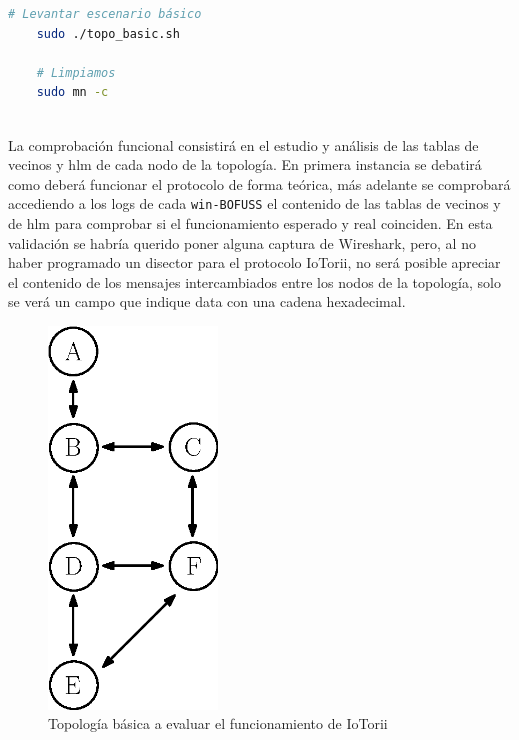 \begin{lstlisting}[language= bash, style=Consola, caption={Puesta en marcha y limpieza del escenario},label=code:eva_scenario]
    # Levantar escenario básico
    sudo ./topo_basic.sh
    
    # Limpiamos
    sudo mn -c
    
\end{lstlisting}
\vspace{0.5cm}

La comprobación funcional consistirá en el estudio y análisis de las tablas de vecinos y \gls{hlm} de cada nodo de la topología. En primera instancia se debatirá como deberá funcionar el protocolo de forma teórica, más adelante se comprobará accediendo a los logs de cada \texttt{win-BOFUSS} el contenido de las tablas de vecinos y de \gls{hlm} para comprobar si el funcionamiento esperado y real coinciden. En esta validación se habría querido poner alguna captura de Wireshark, pero, al no haber programado un disector para el protocolo IoTorii, no será posible apreciar el contenido de los mensajes intercambiados entre los nodos de la topología, solo se verá un campo que indique data con una cadena hexadecimal.\\



\begin{figure}[ht]
    \centering
    \includegraphics[width=0.4\textwidth]{archivos/img/dev/topo_eva.eps}
    \caption{Topología básica a evaluar el funcionamiento de IoTorii}
    \label{fig:topo_eva}
\end{figure}

